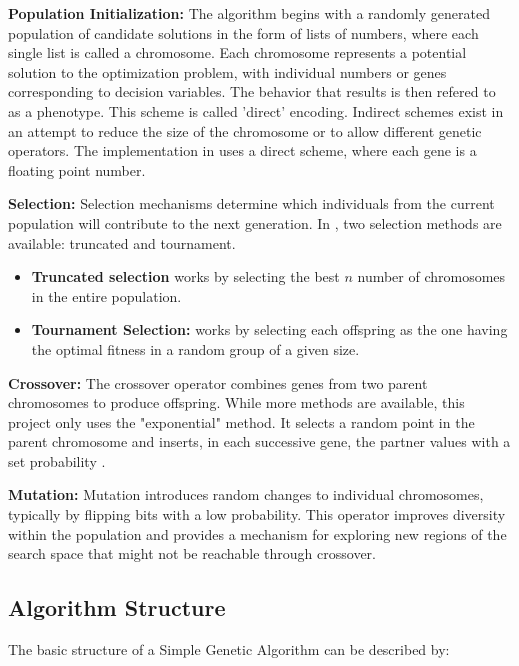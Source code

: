 \textbf{Population Initialization:} The algorithm begins with a randomly generated population of candidate solutions in the form of lists of numbers, where each single list is called a chromosome. Each chromosome represents a potential solution to the optimization problem, with individual numbers or genes corresponding to decision variables. The behavior that results is then refered to as a phenotype. This scheme is called 'direct' encoding. Indirect schemes exist in an attempt to reduce the size of the chromosome or to allow different genetic operators. The implementation in \textcite{Biscani2020} uses a direct scheme, where each gene is a floating point number.

\textbf{Selection:} Selection mechanisms determine which individuals from the current population will contribute to the next generation. In \textcite{Biscani2020}, two selection methods are available: truncated and tournament.
\begin{itemize}
    \item \textbf{Truncated selection} works by selecting the best $n$ number of chromosomes in the entire population.
    \item \textbf{Tournament Selection:}  works by selecting each offspring as the one having the optimal fitness in a random group of a given size.
\end{itemize}

\textbf{Crossover:} The crossover operator combines genes from two parent chromosomes to produce offspring. While more methods are available, this project only uses the "exponential" method. It selects a random point in the parent chromosome and inserts, in each successive gene, the partner values with a set probability \parencite{Biscani2020}.

\textbf{Mutation:} Mutation introduces random changes to individual chromosomes, typically by flipping bits with a low probability. This operator improves diversity within the population and provides a mechanism for exploring new regions of the search space that might not be reachable through crossover.

\subsection{Algorithm Structure}

The basic structure of a Simple Genetic Algorithm can be described by:

